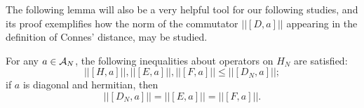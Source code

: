 The following lemma will also be a very helpful tool for our following  studies, and its proof exemplifies how the norm of the commutator $||[D, a]||$ appearing in the definition of Connes' distance, may be studied.

\begin{lemma}\label{lemmaRelationOperatorsAndDirac}
For any $a \in \mathcal A_N$, the following inequalities about operators on $H_N$ are satisfied:
\begin{equation} \label{ineqDN}
    ||[H, a]||, ||[E, a]||, ||[F, a]||  \leq ||[D_N, a]||;
\end{equation} \label{eqDNdiag}
if $a$ is diagonal and hermitian, then
\begin{equation}
    ||[D_N, a]|| = ||[E, a]|| = ||[F, a]||.
\end{equation}
\end{lemma}

